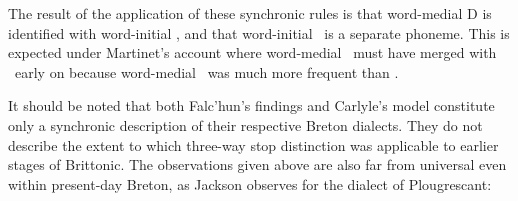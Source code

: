 The result of the application of these synchronic rules is that word-medial \gls{D} is identified with word-initial \lT, and that word-initial \xD\ is a separate \gls{phoneme}. This is expected under Martinet's account where word-medial \xD\ must have merged with \lT\ early on because word-medial \lT\ was much more frequent than \xD.

It should be noted that both Falc'hun's findings and Carlyle's model constitute only a synchronic description of their respective Breton dialects. They do not describe the extent to which three-way stop distinction was applicable to earlier stages of Brittonic. The observations given above are also far from universal even within present-day Breton, as Jackson observes for the dialect of Plougrescant:




